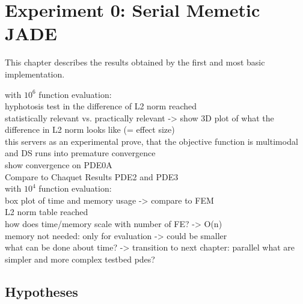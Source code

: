 \documentclass[./\jobname.tex]{subfiles}
\begin{document}
\chapter {Experiment 0: Serial Memetic JADE}
\label{chap:experimet_0}

This chapter describes the results obtained by the first and most basic implementation. 

with $10^6$ function evaluation: \\
hyphotosis test in the difference of L2 norm reached \\
statistically relevant vs. practically relevant -> show 3D plot of what the difference in L2 norm looks like (= effect size) \\
this servers as an experimental prove, that the objective function is multimodal and DS runs into premature convergence \\

show convergence on PDE0A \\
Compare to Chaquet Results PDE2 and PDE3\\

with $10^4$ function evaluation: \\
box plot of time and memory usage -> compare to FEM \\
L2 norm table reached \\
how does time/memory scale with number of FE? -> O(n)\\
memory not needed: only for evaluation -> could be smaller \\
what can be done about time? -> transition to next chapter: parallel
what are simpler and more complex testbed pdes? \\

\section{Hypotheses}

\begin{algorithm}[H]
	\SetAlgoNoLine
	\DontPrintSemicolon
	\label{algo: memeticJADE}
\end{algorithm}
\end{document}
